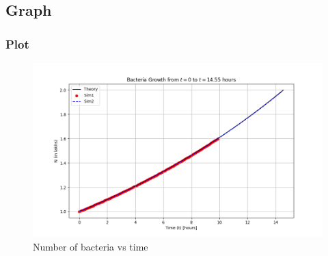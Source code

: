 \documentclass{beamer}
\theoremstyle{remark}
\numberwithin{equation}{section}
\begin{document}
\subsection{Graph}
\begin{frame}[fragile]
\frametitle{Plot}
    \begin{figure}[htbp] %
    \centering
    \includegraphics[width=\textwidth]{figs/plot.png} %
    \caption{Number of bacteria vs time}
\end{figure}
\end{frame}
\end{document}

